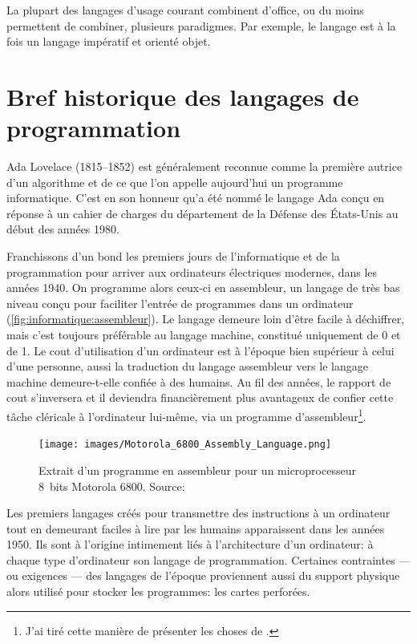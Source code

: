 La plupart des langages d'usage courant combinent d'office, ou du
moins permettent de combiner, plusieurs paradigmes. Par exemple, le
langage {\Cpp} est à la fois un langage impératif et orienté objet.


\section{Bref historique des langages de programmation}
\label{sec:informatique:historique}

Ada Lovelace (1815--1852) est généralement reconnue comme la première
autrice d'un algorithme et de ce que l'on appelle aujourd'hui un
programme informatique. C'est en son honneur qu'a été nommé le langage
Ada conçu en réponse à un cahier de charges du département de la
Défense des États-Unis au début des années 1980.

Franchissons d'un bond les premiers jours de l'informatique et de la
programmation pour arriver aux ordinateurs électriques modernes, dans
les années 1940. On programme alors ceux-ci en
assembleur, un langage de très bas niveau conçu pour
faciliter l'entrée de programmes dans un ordinateur
(\autoref{fig:informatique:assembleur}). Le langage demeure loin
d'être facile à déchiffrer, mais c'est toujours préférable au langage
machine, constitué uniquement de 0 et de 1. Le cout d'utilisation d'un
ordinateur est à l'époque bien supérieur à celui d'une personne, aussi
la traduction du langage assembleur vers le langage machine
demeure-t-elle confiée à des humains. Au fil des années, le rapport de
cout s'inversera et il deviendra financièrement plus avantageux de
confier cette tâche cléricale à l'ordinateur lui-même, via un
programme d'assembleur\footnote{%
  J'ai tiré cette manière de présenter les choses de
  \cite{Oualline:C:1997}.}.

\begin{figure}
  \centering
  \texttt{[image: images/Motorola\_6800\_Assembly\_Language.png]}
  \caption[Programme en assembleur pour un microprocesseur 8~bits
    Motorola 6800]{Extrait d'un programme en assembleur pour un
    microprocesseur 8~bits Motorola 6800. {\small Source:
      }}
  \label{fig:informatique:assembleur}
\end{figure}

Les premiers langages créés pour transmettre des instructions à un
ordinateur tout en demeurant faciles à lire par les humains
apparaissent dans les années 1950. Ils sont à l'origine intimement
liés à l'architecture d'un ordinateur: à chaque type d'ordinateur son
langage de programmation. Certaines contraintes --- ou exigences ---
des langages de l'époque proviennent aussi du support physique alors
utilisé pour stocker les programmes: les cartes perforées.

